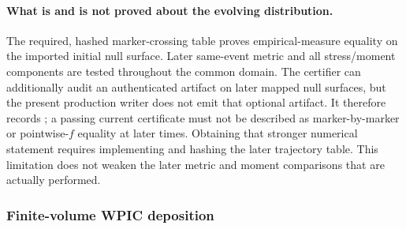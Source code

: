 \paragraph{What is and is not proved about the evolving distribution.}
The required, hashed marker-crossing table proves empirical-measure equality
on the imported initial null surface.  Later same-event metric and all
stress/moment components are tested throughout the common domain.  The
certifier can additionally audit an authenticated
 artifact on later mapped null surfaces, but
the present production writer does not emit that optional artifact.  It
therefore records
; a passing current certificate
must not be described as marker-by-marker or pointwise-\(f\) equality at later
times.  Obtaining that stronger numerical statement requires implementing and
hashing the later trajectory table.  This limitation does not weaken the
later metric and moment comparisons that are actually performed.

\subsubsection{Finite-volume WPIC deposition}

